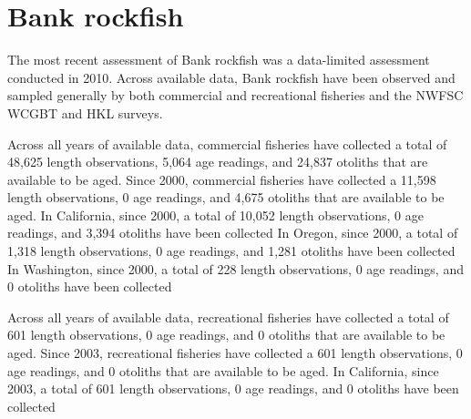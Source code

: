 \documentclass[11pt,
  english,
  letterpaper,
]{article}
\begin{document}

\hypertarget{bank-rockfish}{%
\section{Bank rockfish}\label{bank-rockfish}}

\leavevmode\tagmcend\tagstructend


The most recent assessment of Bank rockfish was a data-limited assessment conducted in 2010. Across available data, Bank rockfish have been observed and sampled generally by both commercial and recreational fisheries and the NWFSC WCGBT and HKL surveys.

\leavevmode\tagmcend\tagstructend\par


Across all years of available data, commercial fisheries have collected a total of 48,625 length observations, 5,064 age readings, and 24,837 otoliths that are available to be aged. Since 2000, commercial fisheries have collected a 11,598 length observations, 0 age readings, and 4,675 otoliths that are available to be aged. In California, since 2000, a total of 10,052 length observations, 0 age readings, and 3,394 otoliths have been collected In Oregon, since 2000, a total of 1,318 length observations, 0 age readings, and 1,281 otoliths have been collected In Washington, since 2000, a total of 228 length observations, 0 age readings, and 0 otoliths have been collected

\leavevmode\tagmcend\tagstructend\par


Across all years of available data, recreational fisheries have collected a total of 601 length observations, 0 age readings, and 0 otoliths that are available to be aged. Since 2003, recreational fisheries have collected a 601 length observations, 0 age readings, and 0 otoliths that are available to be aged. In California, since 2003, a total of 601 length observations, 0 age readings, and 0 otoliths have been collected

\leavevmode\tagmcend\tagstructend\par

\end{document}
